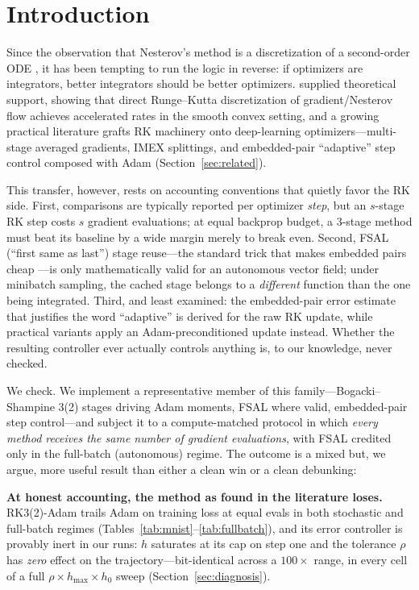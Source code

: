 \documentclass{article}
\newcommand{\hmax}{h_{\max}}
\begin{document}
\section{Introduction}
\label{sec:intro}

Since the observation that Nesterov's method \cite{nesterov1983method} is a discretization of a second-order ODE \cite{su2016differential}, it has been tempting to run the logic in reverse: if optimizers are integrators, better integrators should be better optimizers. \citet{zhang2018direct} supplied theoretical support, showing that direct Runge--Kutta discretization of gradient/Nesterov flow achieves accelerated rates in the smooth convex setting, and a growing practical literature grafts RK machinery onto deep-learning optimizers---multi-stage averaged gradients, IMEX splittings, and embedded-pair ``adaptive'' step control composed with Adam (Section~\ref{sec:related}).

This transfer, however, rests on accounting conventions that quietly favor the RK side. First, comparisons are typically reported per optimizer \emph{step}, but an $s$-stage RK step costs $s$ gradient evaluations; at equal backprop budget, a 3-stage method must beat its baseline by a wide margin merely to break even. Second, FSAL (``first same as last'') stage reuse---the standard trick that makes embedded pairs cheap \cite{bogacki1989pair,hairer1993solving}---is only mathematically valid for an autonomous vector field; under minibatch sampling, the cached stage belongs to a \emph{different} function than the one being integrated. Third, and least examined: the embedded-pair error estimate that justifies the word ``adaptive'' is derived for the raw RK update, while practical variants apply an Adam-preconditioned update instead. Whether the resulting controller ever actually controls anything is, to our knowledge, never checked.

We check. We implement a representative member of this family---Bogacki--Shampine 3(2) stages driving Adam moments, FSAL where valid, embedded-pair step control---and subject it to a compute-matched protocol in which \emph{every method receives the same number of gradient evaluations}, with FSAL credited only in the full-batch (autonomous) regime. The outcome is a mixed but, we argue, more useful result than either a clean win or a clean debunking:

\textbf{At honest accounting, the method as found in the literature loses.} RK3(2)-Adam trails Adam on training loss at equal evals in both stochastic and full-batch regimes (Tables~\ref{tab:mnist}--\ref{tab:fullbatch}), and its error controller is provably inert in our runs: $h$ saturates at its cap on step one and the tolerance $\rho$ has \emph{zero} effect on the trajectory---bit-identical across a $100\times$ range, in every cell of a full $\rho \times \hmax \times h_0$ sweep (Section~\ref{sec:diagnosis}).
\end{document}
